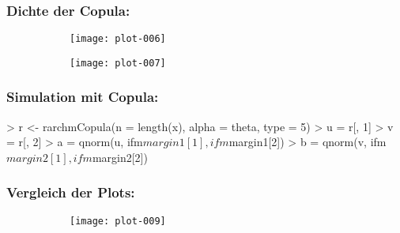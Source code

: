 
\begin{frame}
  \frametitle{Dichte der Copula:}
\begin{figure}[h]  
  \centering
  \begin{minipage}[b]{.45\textwidth} %
    \begin{figure}[htpb]
      \centering
\texttt{[image: plot-006]}
   \end{figure}
 \end{minipage}
 \hspace{.0\linewidth}%
 \begin{minipage}[b]{.45\textwidth} %
   \begin{figure}[htb]
\texttt{[image: plot-007]}
   \end{figure}
 \end{minipage}
\end{figure}

\end{frame}


\begin{frame}[containsverbatim]
  \frametitle{Simulation mit Copula:}

\scriptsize{  
\begin{Schunk}
\begin{Sinput}
> r <- rarchmCopula(n = length(x), alpha = theta, type = 5)
> u = r[, 1]
> v = r[, 2]
> a = qnorm(u, ifm$margin1[1], ifm$margin1[2])
> b = qnorm(v, ifm$margin2[1], ifm$margin2[2])
\end{Sinput}
\end{Schunk}
} 
\end{frame}


\begin{frame}[containsverbatim]
  \frametitle{Vergleich der Plots:}
\begin{figure}
\begin{minipage}[b]{\textheight} %
  \begin{figure}[htb]
    \centering

\texttt{[image: plot-009]}
  \end{figure}
\end{minipage}
\end{figure}
\end{frame}


